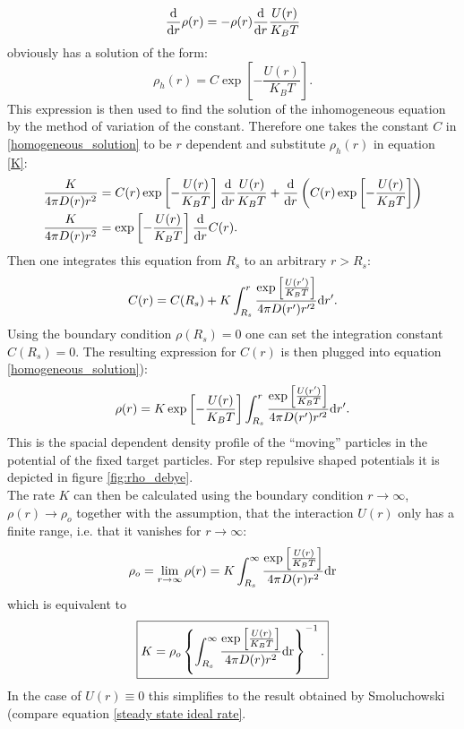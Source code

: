 \begin{equation}
    \frac{\rm d}{{\rm d} r} \rho(r) = -\rho(r) \frac{\rm d}{ {\rm d} r} \frac{U(r)}{K_B T}
    \label{homogeneous_equation}
\end{equation}
obviously has a solution of the form:
\begin{equation}
    \rho_h(r) = C \exp \left[ - \frac{U(r)}{K_B T} \right].
    \label{homogeneous_solution}
\end{equation}
This expression is then used to find the solution of the inhomogeneous equation by the method of variation of the constant. Therefore one takes the constant $C$ in \eqref{homogeneous_solution} to be $r$ dependent and substitute $\rho_h(r)$ in equation \eqref{K}:
\begin{align}
    \frac{K}{4 \pi D(r) r^2} &= C(r) \exp \left[ - \frac{U(r)}{K_B T} \right] \frac{\rm d}{ {\rm d} r} \frac{U(r)}{K_B T} + \frac{\rm d}{ {\rm d} r} \left( C(r) \exp \left[ - \frac{U(r)}{K_B T} \right] \right) \nonumber\\
    \frac{K}{ 4 \pi D(r) r^2} &= \exp \left[ -\frac{U(r)}{K_B T} \right] \frac{\rm d }{ {\rm d} r} C(r).
    \label{equation_C(r)}
\end{align}
Then one integrates this equation from $R_s$ to an arbitrary $r>R_s$:
\begin{equation}
    C(r) = C(R_s) + K\int_{R_s}^{r} \frac{\exp \left[ \frac{U(r')}{K_B T}\right]}{4 \pi D(r') r'^2} {\rm d} r'.
    \label{solution_C(r)}
\end{equation}
Using the boundary condition $\rho(R_s)=0$ one can set the integration constant $C(R_s) = 0$. The resulting expression for $C(r)$ is then plugged into equation \eqref{homogeneous_solution}):
\begin{equation}
    \rho(r) = K\exp \left[ -\frac{U(r)}{K_B T} \right] \int_{R_s}^{r} \frac{\exp \left[ \frac{U(r')}{K_B T}\right]}{4 \pi D(r') r'^2} {\rm d} r'.
    \label{rho_debye}
\end{equation}
This is the spacial dependent density profile of the ``moving'' particles in the potential of the fixed target particles. For step repulsive shaped potentials it is depicted in figure \ref{fig:rho_debye}.\\
The rate $K$ can then be calculated using the boundary condition $r \rightarrow \infty$, $\rho(r) \rightarrow \rho_o$ together with the assumption, that the interaction $U(r)$ only has a finite range, i.e. that it vanishes for $r \rightarrow \infty$:
\begin{equation}
    \rho_o = \lim_{r\rightarrow \infty} \rho(r) = K\int_{R_s}^{\infty} \frac{\exp \left[ \frac{U(r)}{K_B T}\right]}{4 \pi D(r) r^2} \rm d r
    \label{lim_rho_debye_infty}
\end{equation}
which is equivalent to 
\begin{equation}
    \boxed{K = \rho_o \left\{\int_{R_s}^{\infty} \frac{\exp \left[ \frac{U(r)}{K_B T}\right]}{ 4 \pi D(r)r^2} \rm d r \right\}^{-1}.}
    \label{K_Debye}
\end{equation}
In the case of $U(r) \equiv 0$ this simplifies to the result obtained by Smoluchowski (compare equation \eqref{steady state ideal rate}. \par

